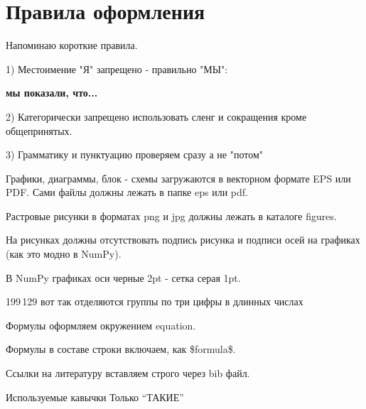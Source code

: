 \section{Правила оформления}

\label{NB-rules}

{ \color{red}

Напоминаю короткие правила.

1) Местоимение "Я" запрещено - правильно "МЫ":

\textbf{мы показали, что... }

2) Категорически запрещено использовать сленг и сокращения кроме общепринятых. 

3) Грамматику и пунктуацию проверяем сразу а не "потом"



Графики, диаграммы, блок - схемы загружаются в векторном формате EPS или PDF. Сами файлы должны лежать в папке eps  или pdf.

Растровые рисунки в форматах png и jpg должны лежать в каталоге figures.

На рисунках должны отсутствовать подпись рисунка и подписи осей на графиках (как это модно в NumPy). 

В NumPy графиках оси черные 2pt - сетка серая 1pt.

199\,129 вот так отделяются группы по три цифры в длинных числах

Формулы оформляем окружением equation.

Формулы в составе строки включаем, как \$formula\$.

Ссылки на литературу вставляем строго через bib файл.

Используемые кавычки Только 
``ТАКИЕ''



}